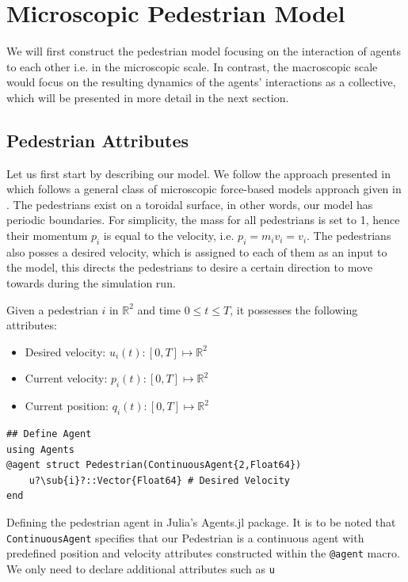 \section{Microscopic Pedestrian Model}

We will first construct the pedestrian model focusing on the interaction of agents to each other i.e. in the microscopic scale. In contrast, the macroscopic scale would focus on the resulting dynamics of the agents' interactions as a collective, which will be presented in more detail in the next section.

\subsection{Pedestrian Attributes}
Let us first start by describing our model. We follow the approach presented in \cite{tordeux2022multi} which follows a general class of microscopic force-based models approach given in \cite{helbing1995social,chraibi2011force}. The pedestrians exist on a toroidal surface, in other words, our model has periodic boundaries. For simplicity, the mass for all pedestrians is set to 1, hence their momentum $p_i$ is equal to the velocity, i.e. $p_i = m_i v_i = v_i$. The pedestrians also posses a desired velocity, which is assigned to each of them as an input to the model, this directs the pedestrians to desire a certain direction to move towards during the simulation run.

Given a pedestrian $i$ in $\mathbb{R}^2$ and time $0\leq t \leq T$, it possesses the following attributes:
\begin{itemize}
    \item Desired velocity: $u_i(t): [0,T] \mapsto \mathbb{R}^2$ 
    \item Current velocity: $p_i(t): [0,T] \mapsto \mathbb{R}^2$
    \item Current position: $q_i(t): [0,T] \mapsto \mathbb{R}^2$
\end{itemize} 
\begin{listing}[!ht]
\begin{verbatim}
## Define Agent
using Agents
@agent struct Pedestrian(ContinuousAgent{2,Float64})
    u?\sub{i}?::Vector{Float64} # Desired Velocity
end
\end{verbatim}
\caption{Defining the pedestrian agent in Julia's Agents.jl package. It is to be noted that \texttt{ContinuousAgent} specifies that our Pedestrian is a continuous agent with predefined position and velocity attributes constructed within the \texttt{@agent} macro. We only need to declare additional attributes such as \texttt{u}} 
\label{code:agent_def}
\end{listing}

